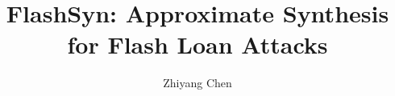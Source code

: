 \documentclass{ut-thesis}
\author{Zhiyang Chen}
\title{FlashSyn: Approximate Synthesis for Flash Loan Attacks}
\begin{document}
  \begin{preliminary}
    \maketitle
    \begin{abstract}
      
    \end{abstract}
    

    
    \tableofcontents
    \listoftables
    \listoffigures
  \end{preliminary}

    
    
    
    
    
    
    
    
    
    
    
  \appendix




{
% 


}
\end{document}
